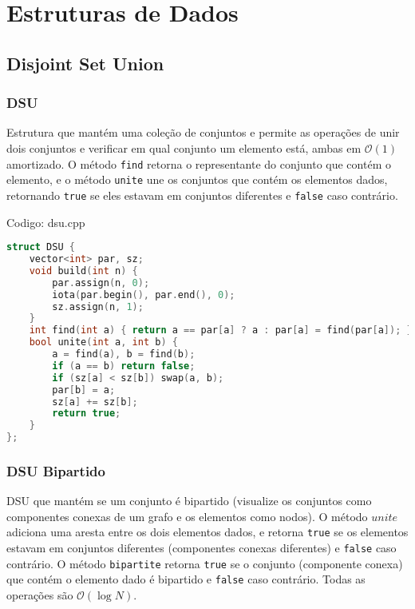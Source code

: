 \documentclass[10pt, a4paper, oneside]{book}
\begin{document}
\chapter{Estruturas de Dados}

\section{Disjoint Set Union}
\subsection{DSU}


Estrutura que mantém uma coleção de conjuntos e permite as operações de unir dois conjuntos e verificar em qual conjunto um elemento está, ambas em $\mathcal{O}(1)$ amortizado. O método \texttt{find} retorna o representante do conjunto que contém o elemento, e o método \texttt{unite} une os conjuntos que contém os elementos dados, retornando \texttt{true} se eles estavam em conjuntos diferentes e \texttt{false} caso contrário.

\hfill

Codigo: dsu.cpp

\begin{lstlisting}[language=C++]
struct DSU {
    vector<int> par, sz;
    void build(int n) {
        par.assign(n, 0);
        iota(par.begin(), par.end(), 0);
        sz.assign(n, 1);
    }
    int find(int a) { return a == par[a] ? a : par[a] = find(par[a]); }
    bool unite(int a, int b) {
        a = find(a), b = find(b);
        if (a == b) return false;
        if (sz[a] < sz[b]) swap(a, b);
        par[b] = a;
        sz[a] += sz[b];
        return true;
    }
};
\end{lstlisting}
\hfill

\subsection{DSU Bipartido}


DSU que mantém se um conjunto é bipartido (visualize os conjuntos como componentes conexas de um grafo e os elementos como nodos). O método $unite$ adiciona uma aresta entre os dois elementos dados, e retorna \texttt{true} se os elementos estavam em conjuntos diferentes (componentes conexas diferentes) e \texttt{false} caso contrário. O método \texttt{bipartite} retorna \texttt{true} se o conjunto (componente conexa) que contém o elemento dado é bipartido e \texttt{false} caso contrário. Todas as operações são $\mathcal{O}(\log N)$.
\end{document}
